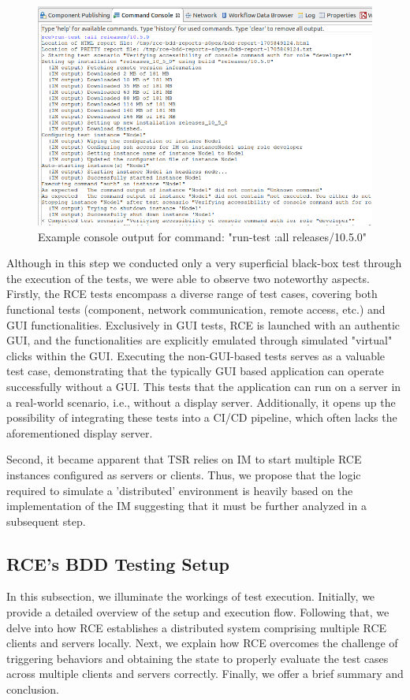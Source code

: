 \begin{figure}
    \centering
    \includegraphics[width=\linewidth]{files/figures/rce-execute-tests.png}
    \caption{Example console output for command: "run-test :all releases/10.5.0"}
    \label{fig:rce-test-output}
\end{figure}


Although in this step we conducted only a very superficial black-box test through the execution of the tests, we were able to observe two noteworthy aspects. Firstly, the \ac{RCE} tests encompass a diverse range of test cases, covering both functional tests (component, network communication, remote access, etc.) and \ac{GUI} functionalities. Exclusively in \ac{GUI} tests, \ac{RCE} is launched with an authentic \ac{GUI}, and the functionalities are explicitly emulated through simulated "virtual" clicks within the \ac{GUI}.
Executing the non-\acs{GUI}-based tests serves as a valuable test case, demonstrating that the typically \acs{GUI} based application can operate successfully without a \acs{GUI}. This tests that the application can run on a server in a real-world scenario, i.e., without a display server. Additionally, it opens up the possibility of integrating these tests into a CI/CD pipeline, which often lacks the aforementioned display server.

Second, it became apparent that \ac{TSR} relies on \ac{IM} to start multiple \ac{RCE} instances configured as servers or clients. Thus, we propose that the logic required to simulate a 'distributed' environment is heavily based on the implementation of the \ac{IM} suggesting that it must be further analyzed in a subsequent step.

\subsection{\ac{RCE}'s BDD Testing Setup}
\label{subsec:BuiltinBDDTest}
In this subsection, we illuminate the workings of test execution. Initially, we provide a detailed overview of the setup and execution flow. Following that, we delve into how \ac{RCE} establishes a distributed system comprising multiple \ac{RCE} clients and servers locally. Next, we explain how \ac{RCE} overcomes the challenge of triggering behaviors and obtaining the state to properly evaluate the test cases across multiple clients and servers correctly. Finally, we offer a brief summary and conclusion.

